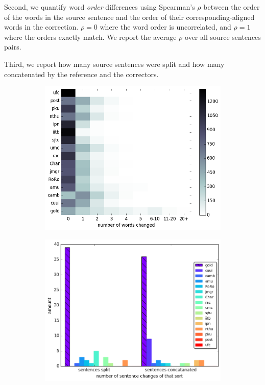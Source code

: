 \documentclass[letterpaper, 11pt]{article}
\begin{document}
Second, we quantify word \emph{order} differences using
Spearman's $\rho$ between the order of the words in the source sentence
and the order of their corresponding-aligned words in the correction.
$\rho=0$ where the word order is uncorrelated, and $\rho=1$ where the orders exactly match. We report the average $\rho$ over all source sentences pairs. 

Third, we report how many source sentences were split and how many concatenated by the reference and the correctors.

\begin{figure}
	\vspace{-0.8cm}
  \centering
  \begin{subfigure}[]{0.6\columnwidth}
    \includegraphics[width = \textwidth]{words_differences_heat}
  \end{subfigure}
  \hfill
  \begin{subfigure}[]{0.6\columnwidth}
    \includegraphics[width = \textwidth]{aligned}

\end{subfigure}
\end{figure}
\end{document}
